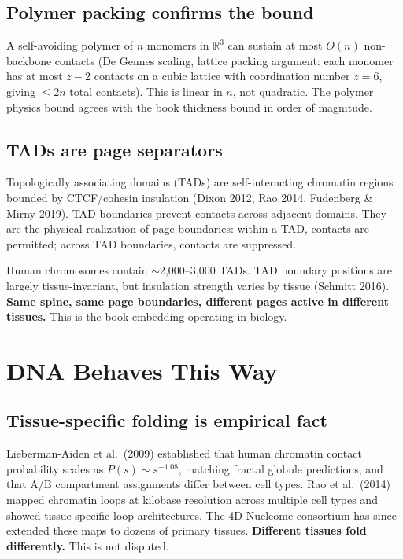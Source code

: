 \documentclass[11pt]{article}
\theoremstyle{definition}
\begin{document}
\subsection{Polymer packing confirms the bound}

A self-avoiding polymer of $n$ monomers in $\mathbb{R}^3$ can sustain at most $O(n)$ non-backbone contacts (De Gennes scaling, lattice packing argument: each monomer has at most $z - 2$ contacts on a cubic lattice with coordination number $z = 6$, giving $\leq 2n$ total contacts). This is linear in $n$, not quadratic. The polymer physics bound agrees with the book thickness bound in order of magnitude.

\subsection{TADs are page separators}

Topologically associating domains (TADs) are self-interacting chromatin regions bounded by CTCF/cohesin insulation (Dixon 2012, Rao 2014, Fudenberg \& Mirny 2019). TAD boundaries prevent contacts across adjacent domains. They are the physical realization of page boundaries: within a TAD, contacts are permitted; across TAD boundaries, contacts are suppressed.

Human chromosomes contain $\sim$2,000--3,000 TADs. TAD boundary positions are largely tissue-invariant, but insulation strength varies by tissue (Schmitt 2016). \textbf{Same spine, same page boundaries, different pages active in different tissues.} This is the book embedding operating in biology.

\section{DNA Behaves This Way}

\subsection{Tissue-specific folding is empirical fact}

Lieberman-Aiden et al.\ (2009) established that human chromatin contact probability scales as $P(s) \sim s^{-1.08}$, matching fractal globule predictions, and that A/B compartment assignments differ between cell types. Rao et al.\ (2014) mapped chromatin loops at kilobase resolution across multiple cell types and showed tissue-specific loop architectures. The 4D Nucleome consortium has since extended these maps to dozens of primary tissues. \textbf{Different tissues fold differently.} This is not disputed.
\end{document}
